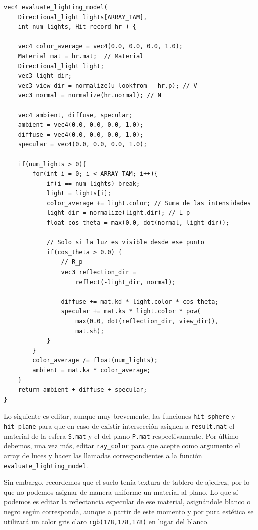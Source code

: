 \begin{lstlisting}
vec4 evaluate_lighting_model( 
    Directional_light lights[ARRAY_TAM], 
    int num_lights, Hit_record hr ) {

    vec4 color_average = vec4(0.0, 0.0, 0.0, 1.0);
    Material mat = hr.mat;  // Material
    Directional_light light;
    vec3 light_dir;
    vec3 view_dir = normalize(u_lookfrom - hr.p); // V
    vec3 normal = normalize(hr.normal); // N

    vec4 ambient, diffuse, specular;
    ambient = vec4(0.0, 0.0, 0.0, 1.0);
    diffuse = vec4(0.0, 0.0, 0.0, 1.0);
    specular = vec4(0.0, 0.0, 0.0, 1.0);

    if(num_lights > 0){
        for(int i = 0; i < ARRAY_TAM; i++){
            if(i == num_lights) break;
            light = lights[i];
            color_average += light.color; // Suma de las intensidades
            light_dir = normalize(light.dir); // L_p
            float cos_theta = max(0.0, dot(normal, light_dir));
            
            // Solo si la luz es visible desde ese punto
            if(cos_theta > 0.0) {
                // R_p
                vec3 reflection_dir = 
                    reflect(-light_dir, normal);

                diffuse += mat.kd * light.color * cos_theta;
                specular += mat.ks * light.color * pow( 
                    max(0.0, dot(reflection_dir, view_dir)), 
                    mat.sh);
            }
        }
        color_average /= float(num_lights);
        ambient = mat.ka * color_average;
    }
    return ambient + diffuse + specular;
}
\end{lstlisting}

Lo siguiente es editar, aunque muy brevemente, las funciones \verb|hit_sphere| y \verb|hit_plane| para que en caso de existir intersección asignen a \verb|result.mat| el material de la esfera \verb|S.mat| y el del plano \verb|P.mat| respectivamente. Por último debemos, una vez más, editar \verb|ray_color| para que acepte como argumento el array de luces y hacer las llamadas correspondientes a la función \verb|evaluate_lighting_model|.

Sin embargo, recordemos que el suelo tenía textura de tablero de ajedrez, por lo que no podemos asignar de manera uniforme un material al plano. Lo que sí podemos es editar la reflectancia especular de ese material, asignándole blanco o negro según corresponda, aunque a partir de este momento y por pura estética se utilizará un color gris claro \verb|rgb(178,178,178)| en lugar del blanco.

